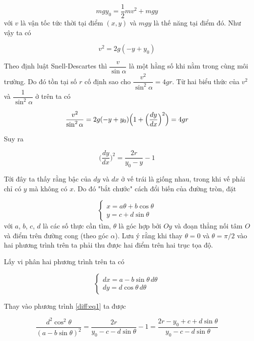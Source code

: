 \documentclass{article}
\begin{document}
\begin{equation*}
	m g y_0 = \frac{1}{2} m v^2 + m g y
\end{equation*}
với $v$ là vận tốc tức thời tại điểm $(x, y)$ và $mgy$ là thế năng tại điểm đó. Như vậy ta có 

\begin{equation}
	v^2 = 2 g (-y + y_0)
\end{equation}

Theo định luật Snell-Descartes thì $\dfrac{v}{\sin \alpha}$ là một hằng số khi nằm trong cùng môi trường. Do đó tồn tại số $r$ cố định sao cho $\dfrac{v^2}{\sin^2 \alpha} = 4 g r$. Từ hai biểu thức của $v^2$ và $\dfrac{1}{\sin^2 \alpha}$ ở trên ta có

\begin{equation}
	\frac{v^2}{\sin^2 \alpha} = 2 g (-y + y_0) \Bigl( 1 + \Bigl(\frac{dy}{dx}\Bigr)^2 \Bigr) = 4 g r
\end{equation}

Suy ra

\begin{equation}
	\Big(\frac{dy}{dx}\Big)^2 = \frac{2 r}{y_0 - y} - 1
	\label{diff:eq1}
\end{equation}

Tới đây ta thấy rằng bậc của $dy$ và $dx$ ở vế trái là giống nhau, trong khi vế phải chỉ có $y$ mà không có $x$. Do đó "bắt chước" cách đổi biến của đường tròn, đặt

\[ \begin{cases}
	x = a \theta + b \cos \theta \\
	y = c + d \sin \theta
\end{cases} \]
với $a$, $b$, $c$, $d$ là các số thực cần tìm, $\theta$ là góc hợp bởi $Oy$ và đoạn thẳng nối tâm $O$ và điểm trên đường cong (theo góc $\alpha$). Lưu ý rằng khi thay $\theta = 0$ và $\theta = \pi / 2$ vào hai phương trình trên ta phải thu được hai điểm trên hai trục tọa độ.

Lấy vi phân hai phương trình trên ta có

\[ \begin{cases}
	dx = a - b \sin \theta \, d \theta \\ dy = d \cos \theta \, d \theta
\end{cases}\]

Thay vào phương trình \ref{diff:eq1} ta được

\begin{equation*}
	\frac{d^2 \cos^2 \theta}{(a - b \sin \theta)^2} = \frac{2 r}{y_0 - c - d \sin \theta} - 1 = \frac{2 r - y_0 + c + d \sin \theta}{y_0 - c - d \sin \theta}
\end{equation*}
\end{document}
